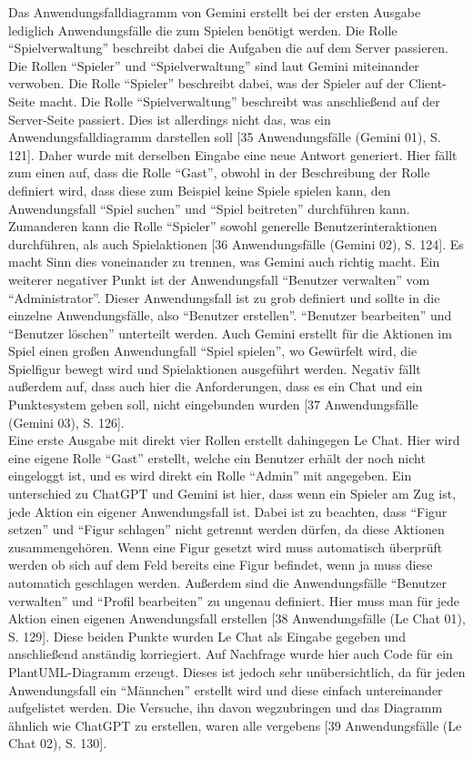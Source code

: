 Das Anwendungsfalldiagramm von Gemini erstellt bei der ersten Ausgabe lediglich Anwendungsfälle die zum Spielen benötigt werden. Die Rolle ``Spielverwaltung'' 
beschreibt dabei die Aufgaben die auf dem Server passieren. Die Rollen ``Spieler'' und ``Spielverwaltung'' sind laut Gemini miteinander verwoben. 
Die Rolle ``Spieler'' beschreibt dabei, was der Spieler auf der Client-Seite macht. Die Rolle ``Spielverwaltung'' beschreibt was anschließend auf der 
Server-Seite passiert. Dies ist allerdings nicht das, was ein Anwendungsfalldiagramm darstellen soll [35 Anwendungsfälle (Gemini 01), S. 121]. 
Daher wurde mit derselben Eingabe eine neue Antwort 
generiert. Hier fällt zum einen auf, dass die Rolle ``Gast'', obwohl in der Beschreibung der Rolle definiert wird, dass diese zum Beispiel keine Spiele 
spielen kann, den Anwendungsfall ``Spiel suchen'' und ``Spiel beitreten'' durchführen kann. Zumanderen kann die Rolle ``Spieler'' sowohl generelle 
Benutzerinteraktionen durchführen, als auch Spielaktionen [36 Anwendungsfälle (Gemini 02), S. 124]. Es macht Sinn dies voneinander zu 
trennen, was Gemini auch richtig macht. Ein weiterer negativer Punkt ist der Anwendungsfall ``Benutzer verwalten'' vom ``Administrator''. 
Dieser Anwendungsfall ist zu grob definiert und sollte in die einzelne Anwendungsfälle, also ``Benutzer erstellen''. ``Benutzer bearbeiten'' 
und ``Benutzer löschen'' unterteilt werden. Auch Gemini erstellt für 
die Aktionen im Spiel einen großen Anwendungfall ``Spiel spielen'', wo Gewürfelt wird, die Spielfigur bewegt wird und Spielaktionen ausgeführt werden.
Negativ fällt außerdem auf, dass auch hier die Anforderungen, dass es ein Chat und ein Punktesystem geben soll, nicht eingebunden wurden 
[37 Anwendungsfälle (Gemini 03), S. 126].\\

Eine erste Ausgabe mit direkt vier Rollen erstellt dahingegen Le Chat. Hier wird eine eigene Rolle ``Gast'' erstellt, welche ein Benutzer erhält der noch nicht eingeloggt ist, und 
es wird direkt ein Rolle ``Admin'' mit angegeben. Ein unterschied zu ChatGPT und Gemini ist hier, dass wenn ein Spieler am Zug ist, jede Aktion ein eigener Anwendungsfall
ist. Dabei ist zu beachten, dass ``Figur setzen'' und ``Figur schlagen'' nicht getrennt werden dürfen, da diese Aktionen zusammengehören. Wenn eine Figur gesetzt 
wird muss automatisch überprüft werden ob sich auf dem Feld bereits eine Figur befindet, wenn ja muss diese automatich geschlagen werden. Außerdem sind die 
Anwendungsfälle ``Benutzer verwalten'' und ``Profil bearbeiten'' zu ungenau definiert. Hier muss man für jede Aktion einen eigenen Anwendungsfall erstellen 
[38 Anwendungsfälle (Le Chat 01), S. 129]. Diese beiden Punkte wurden Le Chat als Eingabe gegeben und anschließend anständig korriegiert. 
Auf Nachfrage wurde hier auch Code für ein PlantUML-Diagramm erzeugt. Dieses ist jedoch sehr unübersichtlich, da für jeden Anwendungsfall 
ein ``Männchen'' erstellt wird und diese einfach untereinander aufgelistet werden. Die Versuche, ihn davon wegzubringen 
und das Diagramm ähnlich wie ChatGPT zu erstellen, waren alle vergebens [39 Anwendungsfälle (Le Chat 02), S. 130].\\

